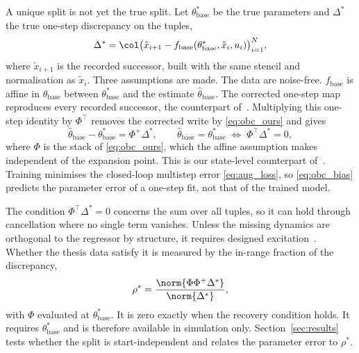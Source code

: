 A unique split is not yet the true split.
Let $\theta^*_{\mathrm{base}}$ be the true parameters and $\Delta^*$ the true
one-step discrepancy on the tuples,
\begin{equation}
 \Delta^*=\col\bigl(\tilde x_{i+1}-f_{\mathrm{base}}(\theta^*_{\mathrm{base}},
 \tilde x_i,u_i)\bigr)_{i=1}^{N},
\label{eq:obc_delta}
\end{equation}
where $\tilde x_{i+1}$ is the recorded successor, built with the same stencil
and normalisation as $\tilde x_i$.
Three assumptions are made.
The data are noise-free.
$f_{\mathrm{base}}$ is affine in $\theta_{\mathrm{base}}$ between
$\theta^*_{\mathrm{base}}$ and the estimate $\hat\theta_{\mathrm{base}}$.
The corrected one-step map reproduces every recorded successor, the
counterpart of~\cite[Assumption~6]{gyorok2026obc}.
Multiplying this one-step identity by $\Phi^\top$ removes the corrected write
by \eqref{eq:obc_ours} and gives
\begin{equation}
 \hat\theta_{\mathrm{base}}-\theta^*_{\mathrm{base}}=\Phi^{+}\Delta^*,
 \qquad
 \hat\theta_{\mathrm{base}}=\theta^*_{\mathrm{base}}
 \;\Longleftrightarrow\;
 \Phi^\top\Delta^*=0,
\label{eq:obc_bias}
\end{equation}
where $\Phi$ is the stack of \eqref{eq:obc_ours}, which the affine assumption
makes independent of the expansion point.
This is our state-level counterpart of~\cite[Cond.~4,
Eq.~(21)]{gyorok2026obc}.
Training minimises the closed-loop multistep error \eqref{eq:aug_loss}, so
\eqref{eq:obc_bias} predicts the parameter error of a one-step fit, not that
of the trained model.

The condition $\Phi^\top\Delta^*=0$ concerns the sum over all tuples, so it can
hold through cancellation where no single term vanishes.
Unless the missing dynamics are orthogonal to the regressor by structure, it
requires designed excitation~\cite[Sec.~4.1, Remark~5]{gyorok2026obc}.
Whether the thesis data satisfy it is measured by the in-range fraction of the
discrepancy,
\begin{equation}
 \rho^*=\frac{\norm{\Phi\Phi^{+}\Delta^*}}{\norm{\Delta^*}},
\label{eq:obc_overlap}
\end{equation}
with $\Phi$ evaluated at $\theta^*_{\mathrm{base}}$.
It is zero exactly when the recovery condition holds.
It requires $\theta^*_{\mathrm{base}}$ and is therefore available in
simulation only.
Section~\ref{sec:results} tests whether the split is start-independent and
relates the parameter error to $\rho^*$.
